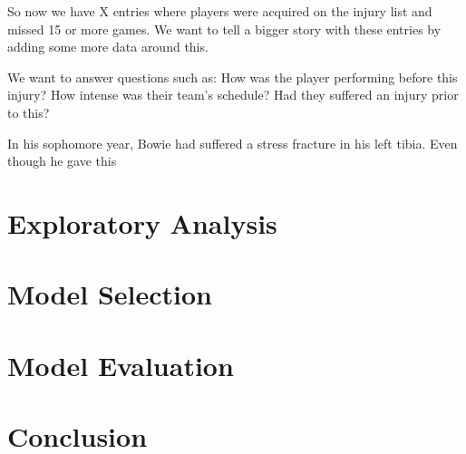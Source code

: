 \documentclass{article}
\begin{document}
So now we have X entries where players were acquired on the injury list
and missed 15 or more games.
We want to tell a bigger story with these entries by adding some more data 
around this. 

We want to answer questions such as: How was the player performing before this injury? How intense
was their team's schedule? Had they suffered an injury prior to this?



In his sophomore year, Bowie had suffered a stress fracture in his left tibia. Even though he gave this 

\newpage
\section*{Exploratory Analysis}



\section*{Model Selection}

\section*{Model Evaluation}

\section*{Conclusion}
\end{document}
